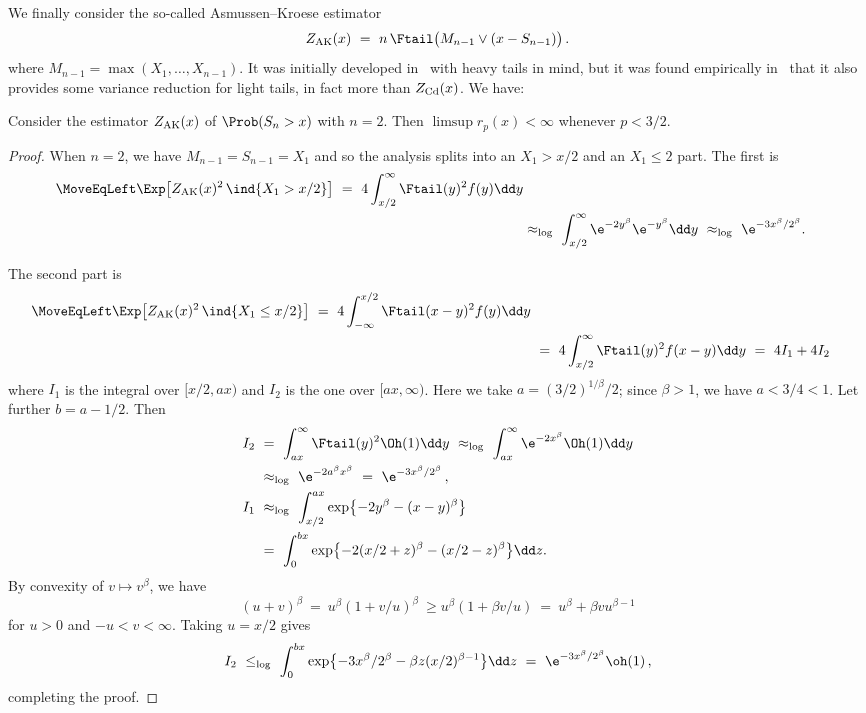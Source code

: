 We finally consider the so-called Asmussen--Kroese estimator
\begin{equation}\label{asmussen2006improved}
Z_{\rm AK}(x)\ =\ n\,\Ftail\bigl(M_{n-1}\vee(x-S_{n-1})\bigr)\,.
\end{equation}
where $M_{n-1}=\max(X_1,\ldots,X_{n-1})$. It was initially developed in~\cite{asmussen2006improved} with heavy tails
in mind, but it was found empirically in~\cite{asmussen2017conditional} that it also provides some
variance reduction for light tails, in fact more than $Z_{\rm Cd}(x)$. We have:\\
\begin{proposition}\label{Prop:SA7.2b} Consider the
estimator $Z_{\rm AK}(x)$ of $\Prob(S_n>x)$ with $n=2$. Then
$\limsup r_p(x)<\infty$ whenever $p<3/2$.
\end{proposition}
\begin{proof} When $n=2$, we have $M_{n-1}=S_{n-1}=X_1$ and so the analysis
splits into an $X_1>x/2$ and an $X_1\le 2$ part. The first is
\begin{align*}\MoveEqLeft
 \Exp\bigl[Z_{\rm AK}(x)^2 \, \ind{X_1>x/2}\bigr]\ =\ 4\int_{x/2}^\infty
 \Ftail(y)^2f(y)\dd y\\ & \approx_{\log}\ \int_{x/2}^\infty
\e^{-2y^\beta}\e^{-y^\beta}\dd y\  \approx_{\log}\ \e^{-3x^\beta/2^\beta}.
\end{align*}

The second part is
\begin{align*}\MoveEqLeft
 \Exp\bigl[Z_{\rm AK}(x)^2 \, \ind{X_1\le x/2}\bigr]\ =\ 4\int_{-\infty}^{x/2}
 \Ftail(x-y)^2f(y)\dd y\\ &  \ =\ 4\int_{x/2}^\infty
 \Ftail(y)^2f(x-y)\dd y\ = \ 4I_1+4I_2
\end{align*}
where $I_1$ is the integral over $[x/2,ax)$ and $I_2$ is the one over $[ax,\infty)$.
Here we take
$a=(3/2)^{1/\beta}/2$;
since $\beta>1$, we have $a<3/4<1$. Let further $b=a-1/2$. Then
\begin{align*}
I_2\ &=\ \int_{ ax}^\infty  \Ftail(y)^2\Oh(1)\dd y\ \approx_{\log} \ \int_{ ax}^\infty  \e^{-2x^\beta}\Oh(1)\dd y\\
 &\approx_{\log}\    \e^{-2a^\beta x^\beta}\ =\  \e^{-3 x^\beta/2^\beta}\,,\\
I_1\ &\approx_{\log}\ \int_{x/2}^{ ax} \exp\bigl\{-2y^\beta-(x-y)^\beta\bigr\}\\& =\
\int_0^{ bx} \exp\bigl\{-2(x/2+z)^\beta-(x/2-z)^\beta\bigr\}\dd z .
\end{align*}
By convexity of $v\mapsto v^\beta$, we have \[(u+v)^\beta\ =\ u^\beta(1+v/u)^\beta \ \ge u^\beta(1+\beta v/u)\ =\
 u^\beta+\beta v  u^{\beta-1}\]
 for $u>0$ and $-u<v<\infty$. Taking $u=x/2$ gives %
 \begin{align*}I_2\ \le_{\log}\ \int_0^{ bx} \exp\bigl\{-3x^\beta/2^\beta-\beta z(x/2)^{\beta-1}\bigr\}\dd z\ =\
 \e^{-3 x^\beta/2^\beta}\oh(1)\,,
 \end{align*}
 completing the proof.
 \end{proof}

